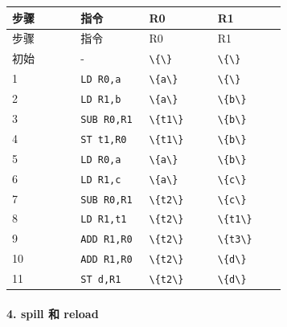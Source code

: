 \documentclass[UTF8]{ctexart}
\begin{document}
\begin{longtable}{|p{0.23\linewidth}|p{0.23\linewidth}|p{0.23\linewidth}|p{0.23\linewidth}|}
\hline
步骤 & 指令 & R0 & R1 \\
\hline
\endfirsthead
步骤 & 指令 & R0 & R1 \\
\hline
\endhead
初始 & - & \texttt{\textbackslash{}\{\textbackslash{}\}} & \texttt{\textbackslash{}\{\textbackslash{}\}} \\
\hline
1 & \texttt{LD R0,a} & \texttt{\textbackslash{}\{a\textbackslash{}\}} & \texttt{\textbackslash{}\{\textbackslash{}\}} \\
\hline
2 & \texttt{LD R1,b} & \texttt{\textbackslash{}\{a\textbackslash{}\}} & \texttt{\textbackslash{}\{b\textbackslash{}\}} \\
\hline
3 & \texttt{SUB R0,R1} & \texttt{\textbackslash{}\{t1\textbackslash{}\}} & \texttt{\textbackslash{}\{b\textbackslash{}\}} \\
\hline
4 & \texttt{ST t1,R0} & \texttt{\textbackslash{}\{t1\textbackslash{}\}} & \texttt{\textbackslash{}\{b\textbackslash{}\}} \\
\hline
5 & \texttt{LD R0,a} & \texttt{\textbackslash{}\{a\textbackslash{}\}} & \texttt{\textbackslash{}\{b\textbackslash{}\}} \\
\hline
6 & \texttt{LD R1,c} & \texttt{\textbackslash{}\{a\textbackslash{}\}} & \texttt{\textbackslash{}\{c\textbackslash{}\}} \\
\hline
7 & \texttt{SUB R0,R1} & \texttt{\textbackslash{}\{t2\textbackslash{}\}} & \texttt{\textbackslash{}\{c\textbackslash{}\}} \\
\hline
8 & \texttt{LD R1,t1} & \texttt{\textbackslash{}\{t2\textbackslash{}\}} & \texttt{\textbackslash{}\{t1\textbackslash{}\}} \\
\hline
9 & \texttt{ADD R1,R0} & \texttt{\textbackslash{}\{t2\textbackslash{}\}} & \texttt{\textbackslash{}\{t3\textbackslash{}\}} \\
\hline
10 & \texttt{ADD R1,R0} & \texttt{\textbackslash{}\{t2\textbackslash{}\}} & \texttt{\textbackslash{}\{d\textbackslash{}\}} \\
\hline
11 & \texttt{ST d,R1} & \texttt{\textbackslash{}\{t2\textbackslash{}\}} & \texttt{\textbackslash{}\{d\textbackslash{}\}} \\
\hline
\end{longtable}

\paragraph*{4. spill 和 reload}
\end{document}
